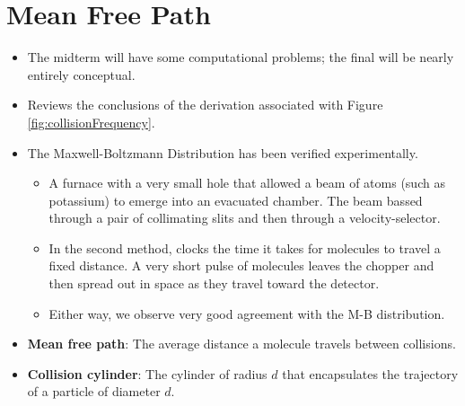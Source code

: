 \documentclass[../notes.tex]{subfiles}
\begin{document}
\section{Mean Free Path}
\begin{itemize}
    \item {}The midterm will have some computational problems; the final will be nearly entirely conceptual.
    \item Reviews the conclusions of the derivation associated with Figure \ref{fig:collisionFrequency}.
    \item The Maxwell-Boltzmann Distribution has been verified experimentally.
    \begin{itemize}
        \item A furnace with a very small hole that allowed a beam of atoms (such as potassium) to emerge into an evacuated chamber. The beam bassed through a pair of collimating slits and then through a velocity-selector.
        \item In the second method, clocks the time it takes for molecules to travel a fixed distance. A very short pulse of molecules leaves the chopper and then spread out in space as they travel toward the detector.
        \item Either way, we observe very good agreement with the M-B distribution.
    \end{itemize}
    \item \textbf{Mean free path}: The average distance a molecule travels between collisions.
    \item \textbf{Collision cylinder}: The cylinder of radius $d$ that encapsulates the trajectory of a particle of diameter $d$.
    \begin{figure}[h!]
        \centering
\end{figure}
\end{itemize}
\end{document}
